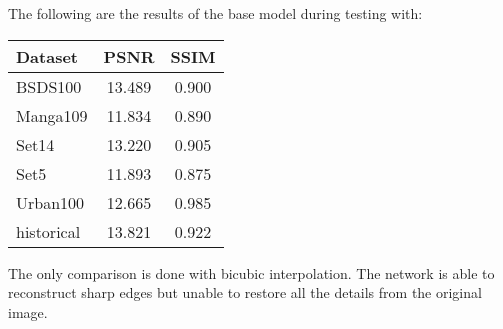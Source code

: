 The following are the results of the base model during testing with:

\begin{tabular}{l|cc}
    Dataset & PSNR & SSIM \\
    \hline
    BSDS100 & 13.489 & 0.900 \\
    Manga109 & 11.834 & 0.890 \\
    Set14 & 13.220 & 0.905 \\
    Set5 & 11.893 & 0.875 \\
    Urban100 & 12.665 & 0.985 \\
    historical\footnotemark & 13.821 & 0.922
\end{tabular}

The only comparison is done with bicubic interpolation. 
The network is able to reconstruct sharp edges but unable to restore all the details from the original image. 


